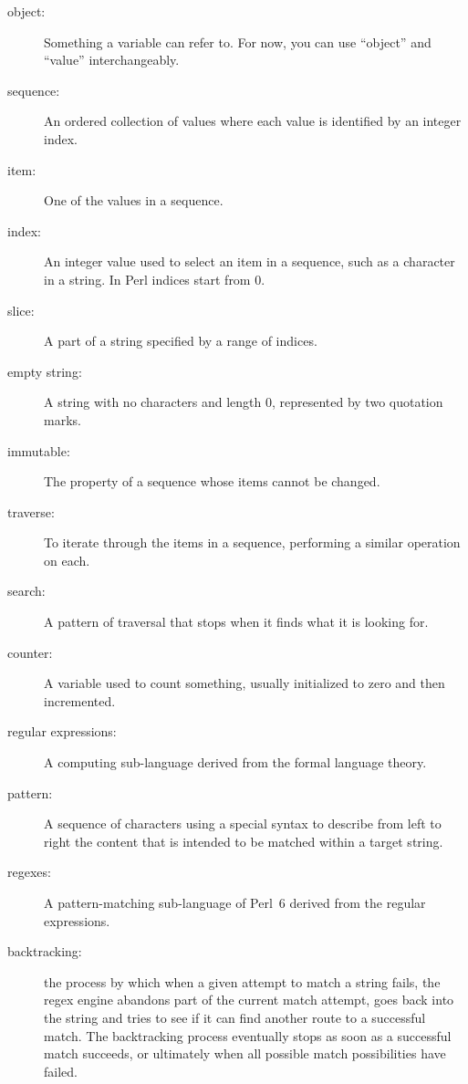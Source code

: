 \begin{description}

\item[object:] Something a variable can refer to.  For now,
you can use ``object'' and ``value'' interchangeably.

\item[sequence:] An ordered collection of
values where each value is identified by an integer index.

\item[item:] One of the values in a sequence.

\item[index:] An integer value used to select an item in
a sequence, such as a character in a string.  In Perl
indices start from 0.

\item[slice:] A part of a string specified by a range of indices.

\item[empty string:] A string with no characters and length 0, represented
by two quotation marks.

\item[immutable:] The property of a sequence whose items cannot
be changed.

\item[traverse:] To iterate through the items in a sequence,
performing a similar operation on each.

\item[search:] A pattern of traversal that stops
when it finds what it is looking for.

\item[counter:] A variable used to count something, usually initialized
to zero and then incremented.

\item[regular expressions:] A computing sub-language derived 
from the formal language theory.

\item[pattern:] A sequence of characters using a special 
syntax to describe from left to right the content that 
is intended to be matched within a target string.

\item[regexes:] A pattern-matching sub-language of Perl~6 
derived from the regular expressions.

\item[backtracking:] the process by which when a given attempt 
to match a string fails, the regex engine abandons part of 
the current match attempt, goes back into the string and 
tries to see if it can find another route to a successful 
match. The backtracking process eventually stops as soon 
as a successful match succeeds, or ultimately when all 
possible match possibilities have failed.

\end{description}


